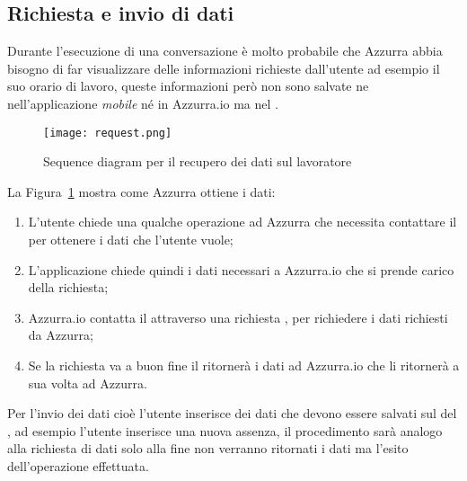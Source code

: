 \subsection{Richiesta e invio di dati}
Durante l'esecuzione di una conversazione è molto probabile che Azzurra abbia bisogno di far visualizzare delle informazioni richieste dall'utente ad esempio il suo orario di lavoro, queste informazioni però non sono salvate ne nell'applicazione \emph{mobile} né in Azzurra.io ma nel .
\begin{figure}[h]
	\begin{center}
		\texttt{[image: request.png]}
		\caption{Sequence diagram per il recupero dei dati sul lavoratore}\label{fig:request}
	\end{center}
\end{figure}
La Figura~\ref{fig:request} mostra come Azzurra ottiene i dati:
\begin{enumerate}
	\item L'utente chiede una qualche operazione ad Azzurra che necessita contattare il  per ottenere i dati che l'utente vuole;
	\item L'applicazione chiede quindi i dati necessari a Azzurra.io che si prende carico della richiesta;
	\item Azzurra.io contatta il  attraverso una richiesta , per richiedere i dati richiesti da Azzurra;
	\item Se la richiesta va a buon fine il  ritornerà i dati ad Azzurra.io che li ritornerà a sua volta ad Azzurra.
\end{enumerate}
Per l'invio dei dati cioè l'utente inserisce dei dati che devono essere salvati sul  del , ad esempio l'utente inserisce una nuova assenza, il procedimento sarà analogo alla richiesta di dati solo alla fine non verranno ritornati i dati ma l'esito dell'operazione effettuata.
